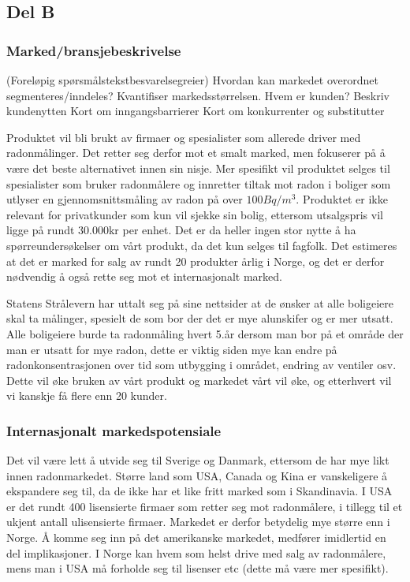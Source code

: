 \subsection{Del B}

\subsubsection{Marked/bransjebeskrivelse}

(Foreløpig spørsmålstekstbesvarelsegreier)
Hvordan kan markedet overordnet segmenteres/inndeles? Kvantifiser markedsstørrelsen. 
Hvem er kunden? Beskriv kundenytten 
Kort om inngangsbarrierer 
Kort om konkurrenter og substitutter 

Produktet vil bli brukt av firmaer og spesialister som allerede driver med radonmålinger. Det retter seg derfor mot et smalt marked, men fokuserer på å være det beste alternativet innen sin nisje. Mer spesifikt vil produktet selges til spesialister som bruker radonmålere og innretter tiltak mot radon i boliger som utlyser en gjennomsnittsmåling av radon på over $100 Bq/m^3$. Produktet er ikke relevant for privatkunder som kun vil sjekke sin bolig, ettersom utsalgspris vil ligge på rundt 30.000kr per enhet. Det er da heller ingen stor nytte å ha spørreundersøkelser om vårt produkt, da det kun selges til fagfolk. Det estimeres at det er marked for salg av rundt 20 produkter årlig i Norge, og det er derfor nødvendig å også rette seg mot et internasjonalt marked.

Statens Strålevern har uttalt seg på sine nettsider at de ønsker at alle boligeiere skal ta målinger, 
spesielt de som bor der det er mye alunskifer og er mer utsatt. Alle boligeiere burde ta radonmåling hvert 
5.år dersom man bor på et område der man er utsatt for mye radon, dette er viktig siden mye kan endre på 
radonkonsentrasjonen over tid som utbygging i området, endring av ventiler osv. Dette vil øke bruken av 
vårt produkt og markedet vårt vil øke, og etterhvert vil vi kanskje få flere enn 20 kunder. 

\subsubsection{Internasjonalt markedspotensiale}
Det vil være lett å utvide seg til Sverige og Danmark, ettersom de har mye likt innen radonmarkedet. Større land som USA, Canada og Kina er vanskeligere å ekspandere seg til, da de ikke har et like fritt marked som i Skandinavia. I USA er det rundt 400 lisensierte firmaer som retter seg mot radonmålere, i tillegg til et ukjent antall ulisensierte firmaer. Markedet er derfor betydelig mye større enn i Norge. Å komme seg inn på det amerikanske markedet, medfører imidlertid en del implikasjoner. I Norge kan hvem som helst drive med salg av radonmålere, mens man i USA må forholde seg til lisenser etc (dette må være mer spesifikt).

